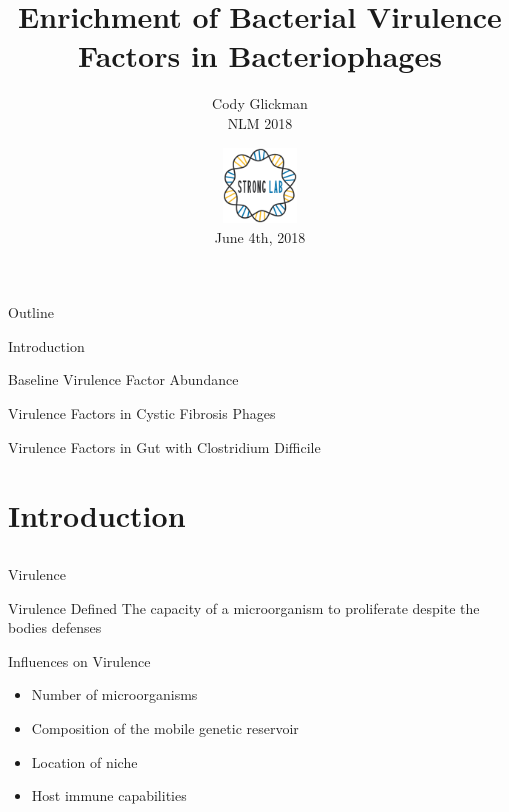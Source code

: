 \documentclass[11pt]{beamer}
\author{Cody Glickman \\ NLM 2018}
\title{Enrichment of Bacterial Virulence Factors in Bacteriophages}
\date{ \includegraphics[height=2cm, width=2cm]{lablogo.png} \\ June 4th, 2018}
\begin{document}
	\maketitle
	\begin{frame}{Outline}
	\begin{block}{Introduction}
	\end{block}
	\vspace{-0.5cm}
	\begin{block}{Baseline Virulence Factor Abundance}
	\end{block}
	\vspace{-0.5cm}
	\begin{block}{Virulence Factors in Cystic Fibrosis Phages}
	\end{block}
	\vspace{-0.5cm}
	\begin{block}{Virulence Factors in Gut with Clostridium Difficile}
	\end{block}
	\vspace{-0.5cm}
	
	\end{frame}

	
\section{Introduction}
\subsection{}

	\begin{frame}{Virulence}
		\begin{block}{Virulence Defined}
		The capacity of a microorganism to proliferate despite the bodies defenses
		\end{block}
		
		\begin{block}{Influences on Virulence}
		\begin{itemize}
		\item Number of microorganisms
		\item \alert{Composition of the mobile genetic reservoir}
		\item Location of niche
		\item Host immune capabilities
		\end{itemize}
		\end{block}
	
	\end{frame}
\end{document}
